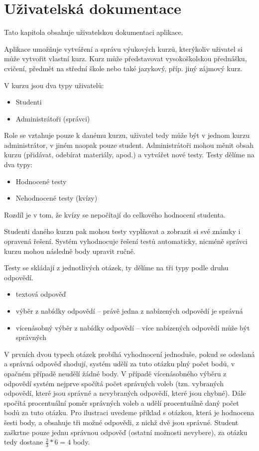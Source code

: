 \section{Uživatelská dokumentace}
\label{UserDoc}

Tato kapitola obsahuje uživatelskou dokumentaci aplikace.

Aplikace umožňuje vytváření a správu výukových kurzů, kterýkoliv uživatel si může vytvořit vlastní kurz.
Kurz může představovat vysokoškolskou přednášku, cvičení, předmět na střední škole nebo také jazykový, příp. jiný zájmový kurz.

V kurzu jsou dva typy uživatelů:
\begin{itemize}
	\item Studenti
	\item Administrátoři (správci)
\end{itemize}

Role se vztahuje pouze k danému kurzu, uživatel tedy může být v jednom kurzu administrátor, v jiném naopak pouze student. 
Administrátoři mohou měnit obsah kurzu (přidávat, odebírat materiály, apod.) a vytvářet nové testy. 
Testy dělíme na dva typy:

\begin{itemize}
	\item Hodnocené testy
	\item Nehodnocené testy (kvízy)
\end{itemize}

Rozdíl je v tom, že kvízy se nepočítají do celkového hodnocení studenta.

Studenti daného kurzu pak mohou testy vyplňovat a zobrazit si své známky i opravená řešení.
Systém vyhodnocuje řešení testů automaticky, nicméně správci kurzu mohou následně body upravit ručně. 

Testy se skládají z jednotlivých otázek, ty dělíme na tři typy podle druhu odpovědí.
\begin{itemize}
	\item textová odpověď
	\item výběr z nabídky odpovědí -- právě jedna z nabízených odpovědí je správná
	\item vícenásobný výběr z nabídky odpovědí -- více nabízených odpovědí může být správných
\end{itemize}

V prvních dvou typech otázek probíhá vyhodnocení jednoduše, pokud se odeslaná a správná odpověď shodují, systém udělí za tuto otázku plný počet bodů, v opačném případě neudělí žádné body.
V případě vícenásobného výběru z odpovědí systém nejprve spočítá počet správných voleb (tzn. vybraných odpovědí, které jsou správné a nevybraných odpovědí, které jsou chybné).
Dále spočítá procentuální poměr správných voleb a udělí procentuálně daný počet bodů za tuto otázku.
Pro ilustraci uvedeme příklad s otázkou, která je hodnocena šesti body, a obsahuje tři možné odpovědi, z nichž dvě jsou správné. Student zaškrtne pouze jednu správnou odpověď (ostatní možnosti nevybere), za otázku tedy dostane $\frac{2}{3} * 6 = 4$ body.


